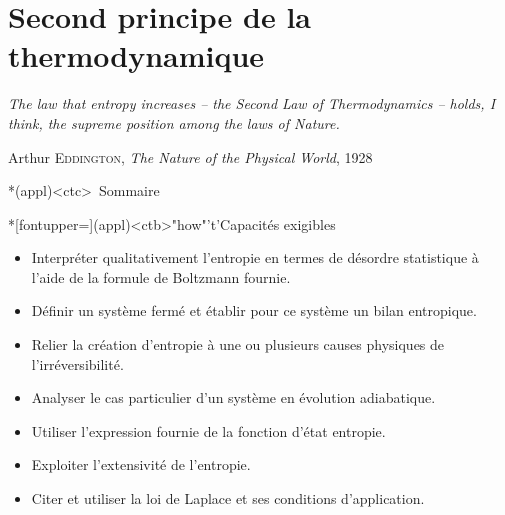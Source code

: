 \documentclass[../../main/main.tex]{subfiles}
\begin{document}
\setcounter{chapter}{3}


\chapter{Second principe de la thermodynamique}

\epigraph{\openquote\textit{%
		The law that entropy increases -- the Second Law of Thermodynamics -- holds,
		I think, the supreme position among the laws of Nature.}%
	\closequote}{Arthur \textsc{Eddington},
	\textit{The Nature of the Physical World}, 1928}

\vspace*{\fill}

\begin{tcn}*(appl)<ctc>{\iconsomm~Sommaire}
	\let\item\olditem
	\vspace{-15pt}
	\minitoc
	\vspace{-25pt}
\end{tcn}
\begin{tcn}*[fontupper=\small](appl)<ctb>"how"'t'{Capacités exigibles}
	\begin{itemize}[label=\rcheck]
		\item Interpréter qualitativement l'entropie en termes de désordre
		      statistique à l'aide de la formule de Boltzmann fournie.

		\item Définir un système fermé et établir pour ce système un bilan
		      entropique.

		\item Relier la création d'entropie à une ou plusieurs causes physiques de
		      l'irréversibilité.

		\item Analyser le cas particulier d'un système en évolution adiabatique.

		\item Utiliser l'expression fournie de la fonction d'état entropie.

		\item Exploiter l'extensivité de l'entropie.

		\item Citer et utiliser la loi de Laplace et ses conditions
		      d'application.
	\end{itemize}
\end{tcn}

\vspace*{\fill}
\end{document}
